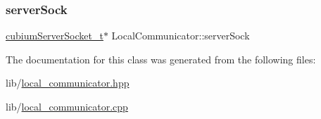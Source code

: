 \mbox{\label{classLocalCommunicator_a4c0d8806e53030c1af6124cd55a34335}} 
\subsubsection{\texorpdfstring{server\+Sock}{serverSock}}
{\footnotesize\ttfamily \hyperlink{structcubiumServerSocket__t}{cubium\+Server\+Socket\+\_\+t}$\ast$ Local\+Communicator\+::server\+Sock\hspace{0.3cm}{\ttfamily [protected]}}



The documentation for this class was generated from the following files\+:\begin{DoxyCompactItemize}
\item 
lib/\hyperlink{local__communicator_8hpp}{local\+\_\+communicator.\+hpp}\item 
lib/\hyperlink{local__communicator_8cpp}{local\+\_\+communicator.\+cpp}\end{DoxyCompactItemize}

